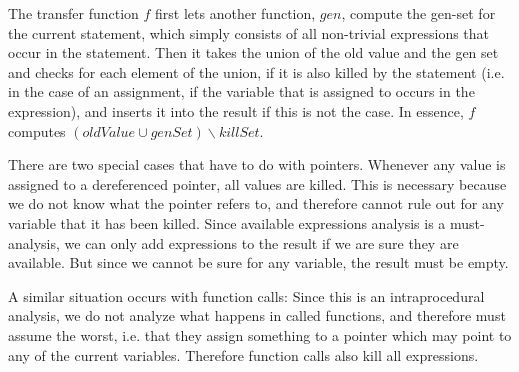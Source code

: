 \documentclass[a4paper,11pt]{article}
\begin{document}
The transfer function $f$ first lets another function, $gen$, compute the gen-set for the current statement, which simply consists of all non-trivial expressions that occur in the statement. Then it takes the union of the old value and the gen set and checks for each element of the union, if it is also killed by the statement (i.e. in the case of an assignment, if the variable that is assigned to occurs in the expression), and inserts it into the result if this is not the case. In essence, $f$ computes $(oldValue \cup genSet) \backslash killSet$.

There are two special cases that have to do with pointers. Whenever any value is assigned to a dereferenced pointer, all values are killed. This is necessary because we do not know what the pointer refers to, and therefore cannot rule out for any variable that it has been killed. Since available expressions analysis is a must-analysis, we can only add expressions to the result if we are sure they are available. But since we cannot be sure for any variable, the result must be empty.

A similar situation occurs with function calls: Since this is an intraprocedural analysis, we do not analyze what happens in called functions, and therefore must assume the worst, i.e. that they assign something to a pointer which may point to any of the current variables. Therefore function calls also kill all expressions.
\end{document}
